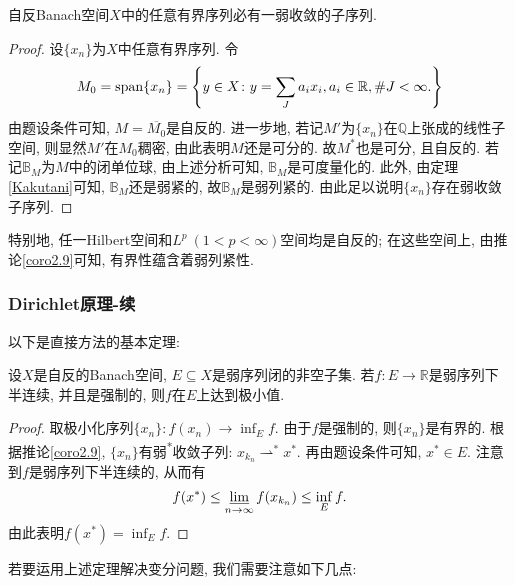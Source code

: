 \begin{corollary}\label{coro2.9}
    自反Banach空间$X$中的任意有界序列必有一弱收敛的子序列.
    \begin{proof}
        设$\{x_n\}$为$X$中任意有界序列. 令
        \begin{equation*}
            M_0 = {\rm span} \{x_n\} = \left\{y \in X\colon y = \sum_Ja_ix_i, a_i \in \mathbb{R}, \# J < \infty.\right\}
        \end{equation*}
        由题设条件可知, $M = \overline{M_0}$是自反的. 进一步地, 若记$M'$为$\{x_n\}$在$\mathbb{Q}$上张成的线性子空间, 则显然$M'$在$M_0$稠密, 由此表明$M$还是可分的.
        故$M^*$也是可分, 且自反的. 若记$\mathbb{B}_M$为$M$中的闭单位球, 由上述分析可知, $\mathbb{B}_M$是可度量化的.
        此外, 由定理\ref{Kakutani}可知, $\mathbb{B}_M$还是弱紧的, 故$\mathbb{B}_M$是弱列紧的.
        由此足以说明$\{x_n\}$存在弱收敛子序列.
    \end{proof}
\end{corollary}

特别地, 任一Hilbert空间和$L^p \ (1 < p < \infty)$空间均是自反的; 在这些空间上, 由推论\ref{coro2.9}可知, 有界性蕴含着弱列紧性.

\subsubsection{Dirichlet原理-续}

以下是直接方法的基本定理: 

\begin{theorem}\label{th2.10}
    设$X$是自反的Banach空间, $E \subseteq X$是弱序列闭的非空子集.
    若$f \colon E \rightarrow \mathbb{R}$是弱序列下半连续, 并且是强制的, 则$f$在$E$上达到极小值.
    \begin{proof}
        取极小化序列$\{x_n\}\colon f(x_n) \rightarrow \inf_Ef$. 由于$f$是强制的, 则$\{x_n\}$是有界的.
        根据推论\ref{coro2.9}, $\{x_n\}$有弱\textsuperscript{*}收敛子列: $x_{k_n} \rightharpoonup^* x^*$. 再由题设条件可知, $x^* \in E$.
        注意到$f$是弱序列下半连续的, 从而有 
        \begin{equation*}
            f(x^*) \leq \varliminf\limits_{n \rightarrow \infty}f(x_{k_n}) \leq \inf_Ef.
        \end{equation*}
        由此表明$f(x^*) = \inf_Ef$.
    \end{proof}
\end{theorem}

若要运用上述定理解决变分问题, 我们需要注意如下几点:

